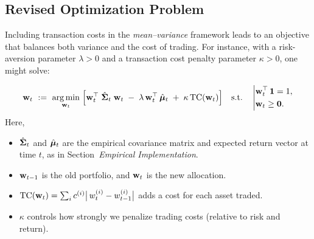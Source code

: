 \subsection{Revised Optimization Problem}
Including transaction costs in the \emph{mean--variance} framework leads to an objective that balances both variance and the cost of trading. For instance, with a risk-aversion parameter \(\lambda > 0\) and a transaction cost penalty parameter \(\kappa > 0\), one might solve:

\[
\mathbf w_t 
~:=~
\underset{\mathbf w_t}{\arg \min}
\;
\Bigl[
    \mathbf w_t^\top \;\hat{\mathbf \Sigma}_t\;\mathbf w_t 
    \;-\;\lambda\, \mathbf w_t^\top \,\hat{\boldsymbol \mu}_t
    \;+\; \kappa \,\mathrm{TC}(\mathbf w_t)
\Bigr]
\quad
\text{s.t.}
\quad
\left|
\begin{aligned}
& \mathbf w_t^\top \,\mathbf 1 = 1, \\
& \mathbf w_t \ge \mathbf 0.
\end{aligned}
\right.
\]
Here,
\begin{itemize}
    \item \(\hat{\mathbf \Sigma}_t\) and \(\hat{\boldsymbol \mu}_t\) are the empirical covariance matrix and expected return vector at time \(t\), as in Section~\emph{Empirical Implementation}.
    \item \(\mathbf w_{t-1}\) is the old portfolio, and \(\mathbf w_t\) is the new allocation.
    \item \(\mathrm{TC}(\mathbf w_t) = \sum_{i} c^{(i)}\bigl|\,w_t^{(i)}-w_{t-1}^{(i)}\bigr|\) adds a cost for each asset traded.
    \item \(\kappa\) controls how strongly we penalize trading costs (relative to risk and return).
\end{itemize}

